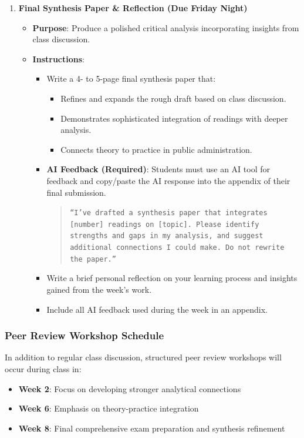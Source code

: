 \documentclass[12pt]{article}     %
\begin{document}
\begin{enumerate}
    \item \textbf{Final Synthesis Paper \& Reflection (Due Friday Night)}
    \begin{itemize}
        \item \textbf{Purpose}: Produce a polished critical analysis incorporating insights from class discussion.
        \item \textbf{Instructions}:
        \begin{itemize}
            \item Write a 4- to 5-page final synthesis paper that:
            \begin{itemize}
                \item Refines and expands the rough draft based on class discussion.
                \item Demonstrates sophisticated integration of readings with deeper analysis.
                \item Connects theory to practice in public administration.
            \end{itemize}
            \item \textbf{AI Feedback (Required)}: Students must use an AI tool for feedback and copy/paste the AI response into the appendix of their final submission.  
            \begin{quote}
                \texttt{``I've drafted a synthesis paper that integrates [number] readings on [topic]. Please identify strengths and gaps in my analysis, and suggest additional connections I could make. Do not rewrite the paper.''}
            \end{quote}
            \item Write a brief personal reflection on your learning process and insights gained from the week's work.
            \item Include all AI feedback used during the week in an appendix.
        \end{itemize}
    \end{itemize}
\end{enumerate}

\subsubsection*{Peer Review Workshop Schedule}

In addition to regular class discussion, structured peer review workshops will occur during class in:
\begin{itemize}
    \item \textbf{Week 2}: Focus on developing stronger analytical connections
    \item \textbf{Week 6}: Emphasis on theory-practice integration
    \item \textbf{Week 8}: Final comprehensive exam preparation and synthesis refinement
\end{itemize}
\end{document}
